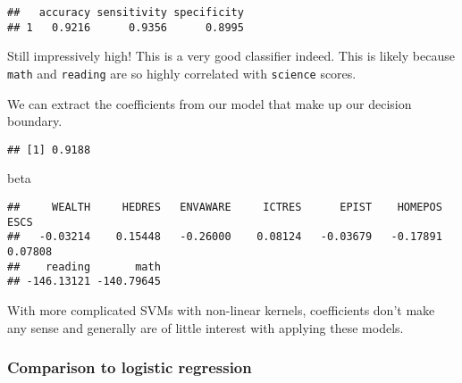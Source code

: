 \documentclass[
]{book}
\newenvironment{Shaded}{\begin{snugshade}}{\end{snugshade}}
\newcommand{\DecValTok}[1]{\textcolor[rgb]{0.00,0.00,0.81}{#1}}
\newcommand{\FunctionTok}[1]{\textcolor[rgb]{0.00,0.00,0.00}{#1}}
\newcommand{\NormalTok}[1]{#1}
\newcommand{\OtherTok}[1]{\textcolor[rgb]{0.56,0.35,0.01}{#1}}
\newcommand{\SpecialCharTok}[1]{\textcolor[rgb]{0.00,0.00,0.00}{#1}}
\begin{document}
\begin{verbatim}
##   accuracy sensitivity specificity
## 1   0.9216      0.9356      0.8995
\end{verbatim}

Still impressively high! This is a very good classifier indeed. This is likely because \texttt{math} and \texttt{reading} are so highly correlated with \texttt{science} scores.

We can extract the coefficients from our model that make up our decision boundary.

\begin{Shaded}
\end{Shaded}

\begin{verbatim}
## [1] 0.9188
\end{verbatim}

\begin{Shaded}
\begin{Highlighting}[]
\NormalTok{beta}
\end{Highlighting}
\end{Shaded}

\begin{verbatim}
##     WEALTH     HEDRES   ENVAWARE     ICTRES      EPIST    HOMEPOS       ESCS 
##   -0.03214    0.15448   -0.26000    0.08124   -0.03679   -0.17891    0.07808 
##    reading       math 
## -146.13121 -140.79645
\end{verbatim}

With more complicated SVMs with non-linear kernels, coefficients don't make any sense and generally are of little interest with applying these models.

\hypertarget{comparison-to-logistic-regression}{%
\subsubsection{Comparison to logistic regression}\label{comparison-to-logistic-regression}}
\end{document}
